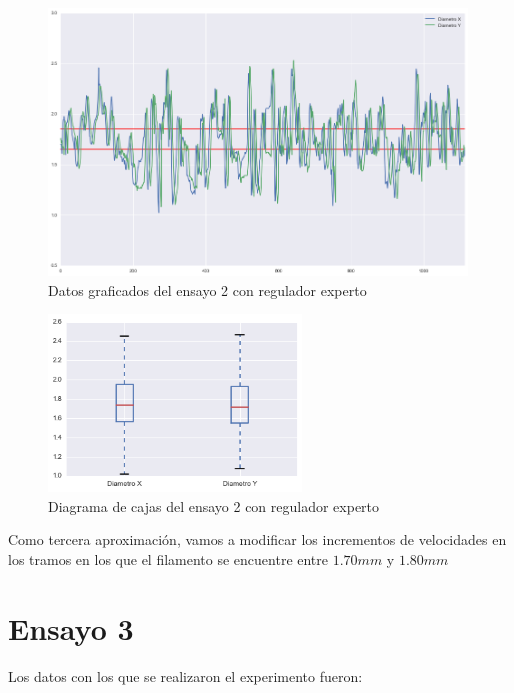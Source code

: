 \begin{figure}[H]
    \centering
    \includegraphics[width=0.99\textwidth]{images/producciones/12082015/output_9_e1.png}
    \caption{Datos graficados del ensayo 2 con regulador experto}
    \label{fig:reg_graf2}
\end{figure}

\begin{figure}[H]
    \centering
    \includegraphics[width=0.6\textwidth]{images/producciones/12082015/output_10_e1.png}
    \caption{Diagrama de cajas del ensayo 2 con regulador experto}
    \label{fig:reg_cajas2}
\end{figure}

Como tercera aproximación, vamos a modificar los incrementos de velocidades en los tramos en los que el filamento se encuentre entre  $1.70 mm$ y $1.80 mm$

\section{Ensayo 3}

Los datos con los que se realizaron el experimento fueron:

